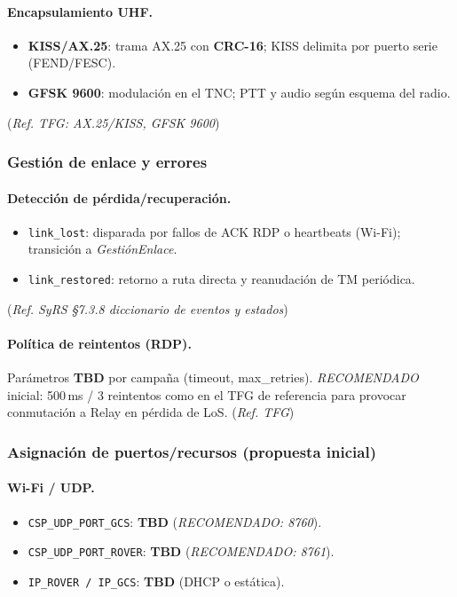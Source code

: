 \paragraph{Encapsulamiento UHF.}
\begin{itemize}
  \item \textbf{KISS/AX.25}: trama AX.25 con \textbf{CRC-16}; KISS delimita por puerto serie (FEND/FESC).
  \item \textbf{GFSK 9600}: modulación en el TNC; PTT y audio según esquema del radio.
\end{itemize}
(\emph{Ref. TFG: AX.25/KISS, GFSK 9600})%

\subsubsection{Gestión de enlace y errores}
\paragraph{Detección de pérdida/recuperación.}
\begin{itemize}
  \item \texttt{link\_lost}: disparada por fallos de ACK RDP o heartbeats (Wi-Fi); transición a \emph{GestiónEnlace}.
  \item \texttt{link\_restored}: retorno a ruta directa y reanudación de TM periódica.
\end{itemize}
(\emph{Ref. SyRS §7.3.8 diccionario de eventos y estados})%

\paragraph{Política de reintentos (RDP).}
Parámetros \textbf{TBD} por campaña (timeout, max\_retries). \emph{RECOMENDADO} inicial: 500\,ms / 3 reintentos
como en el TFG de referencia para provocar conmutación a Relay en pérdida de LoS.%
(\emph{Ref. TFG})%

\subsubsection{Asignación de puertos/recursos (propuesta inicial)}
\paragraph{Wi-Fi / UDP.}
\begin{itemize}
  \item \texttt{CSP\_UDP\_PORT\_GCS}: \textbf{TBD} (\emph{RECOMENDADO: 8760}).
  \item \texttt{CSP\_UDP\_PORT\_ROVER}: \textbf{TBD} (\emph{RECOMENDADO: 8761}).
  \item \texttt{IP\_ROVER / IP\_GCS}: \textbf{TBD} (DHCP o estática). 
\end{itemize}

